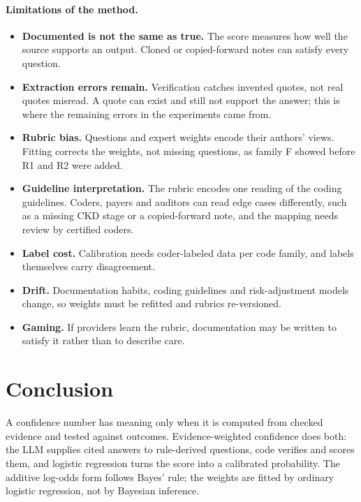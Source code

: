 \documentclass[10pt,letterpaper]{article}
\begin{document}
\paragraph{Limitations of the method.}
\begin{itemize}
  \item \textbf{Documented is not the same as true.} The score measures how well the source supports an output. Cloned or copied-forward notes can satisfy every question.
  \item \textbf{Extraction errors remain.} Verification catches invented quotes, not real quotes misread. A quote can exist and still not support the answer; this is where the remaining errors in the experiments came from.
  \item \textbf{Rubric bias.} Questions and expert weights encode their authors' views. Fitting corrects the weights, not missing questions, as family F showed before R1 and R2 were added.
  \item \textbf{Guideline interpretation.} The rubric encodes one reading of the coding guidelines. Coders, payers and auditors can read edge cases differently, such as a missing CKD stage or a copied-forward note, and the mapping needs review by certified coders.
  \item \textbf{Label cost.} Calibration needs coder-labeled data per code family, and labels themselves carry disagreement.
  \item \textbf{Drift.} Documentation habits, coding guidelines and risk-adjustment models change, so weights must be refitted and rubrics re-versioned.
  \item \textbf{Gaming.} If providers learn the rubric, documentation may be written to satisfy it rather than to describe care.
\end{itemize}

\section{Conclusion}

A confidence number has meaning only when it is computed from checked evidence and tested against outcomes. Evidence-weighted confidence does both: the LLM supplies cited answers to rule-derived questions, code verifies and scores them, and logistic regression turns the score into a calibrated probability. The additive log-odds form follows Bayes' rule; the weights are fitted by ordinary logistic regression, not by Bayesian inference.
\end{document}
